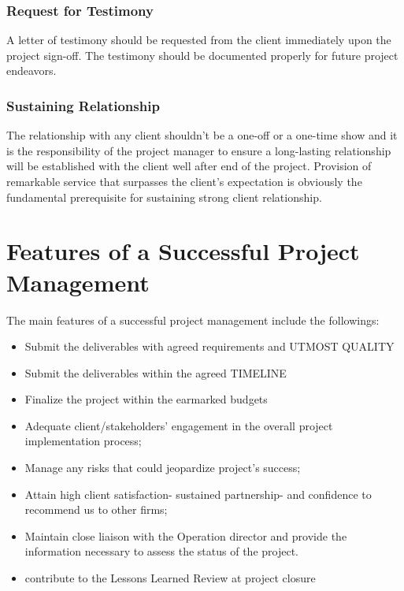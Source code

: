 \documentclass[
]{book}
\theoremstyle{definition}
\theoremstyle{definition}
\theoremstyle{definition}
\theoremstyle{definition}
\theoremstyle{remark}
\begin{document}
\hypertarget{request-for-testimony}{%
\subsection{Request for Testimony}\label{request-for-testimony}}

A letter of testimony should be requested from the client immediately upon the project sign-off. The testimony should be documented properly for future project endeavors.

\hypertarget{sustaining-relationship}{%
\subsection{Sustaining Relationship}\label{sustaining-relationship}}

The relationship with any client shouldn't be a one-off or a one-time show and it is the responsibility of the project manager to ensure a long-lasting relationship will be established with the client well after end of the project. Provision of remarkable service that surpasses the client's expectation is obviously the fundamental prerequisite for sustaining strong client relationship.

\hypertarget{features-of-a-successful-project-management}{%
\chapter{Features of a Successful Project Management}\label{features-of-a-successful-project-management}}

The main features of a successful project management include the followings:

\begin{itemize}
\item
  Submit the deliverables with agreed requirements and UTMOST QUALITY
\item
  Submit the deliverables within the agreed TIMELINE
\item
  Finalize the project within the earmarked budgets
\item
  Adequate client/stakeholders' engagement in the overall project implementation process;
\item
  Manage any risks that could jeopardize project's success;
\item
  Attain high client satisfaction- sustained partnership- and confidence to recommend us to other firms;
\item
  Maintain close liaison with the Operation director and provide the information necessary to assess the status of the project.
\item
  contribute to the Lessons Learned Review at project closure
\end{itemize}
\end{document}
